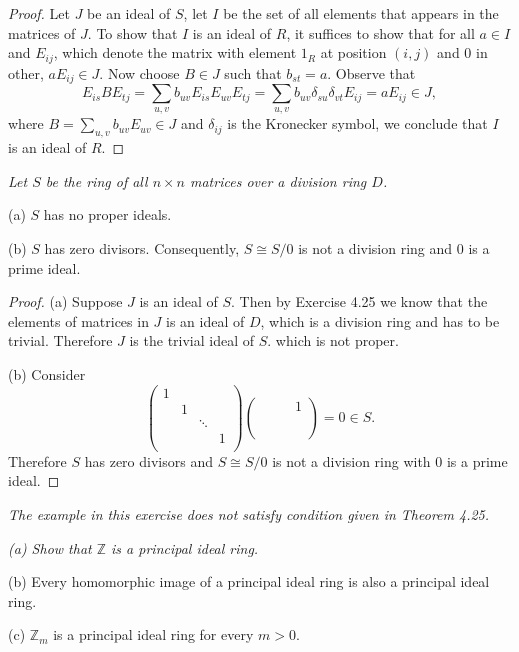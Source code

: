\begin{proof}
Let $J$ be an ideal of $S$, let $I$ be the set of all elements that appears in the matrices of $J$. To show that $I$ is an ideal of $R$, it suffices to show that for all $a\in I$ and $E_{ij}$, which denote the matrix with element $1_R$ at position $(i,j)$ and $0$ in other, $aE_{ij}\in J$. Now choose $B\in J$ such that $b_{st}=a$. Observe that 
$$
E_{is}BE_{tj}=\sum_{u,v}{b_{uv}E_{is}E_{uv}E_{tj}}=\sum_{u,v}{b_{uv}\delta _{su}\delta _{vt}E_{ij}}=aE_{ij}\in J,
$$
where $B=\sum_{u,v}b_{uv}E_{uv}\in J$ and $\delta_{ij}$ is the Kronecker symbol, we conclude that $I$ is an ideal of $R$.
\end{proof}
\begin{problem}\em
Let $S$ be the ring of all $n\times n$ matrices over a division ring $D$.\par
(a) $S$ has no proper ideals.\par
(b) $S$ has zero divisors. Consequently, $S\cong S/0$ is not a division ring and $0$ is a prime ideal.
\end{problem}
\begin{proof}
(a) Suppose $J$ is an ideal of $S$. Then by Exercise 4.25 we know that the elements of matrices in $J$ is an ideal of $D$, which is a division ring and has to be trivial. Therefore $J$ is the trivial ideal of $S$. which is not proper.\par
(b) Consider 
$$
\left( \begin{matrix}
	1&		&		&		\\
	&		1&		&		\\
	&		&		\ddots&		\\
	&		&		&		1\\
\end{matrix} \right) \left( \begin{matrix}
	&		&		&		1\\
	&		&		&		\\
	&		&		&		\\
	&		&		&		\\
\end{matrix} \right) =0\in S.
$$
Therefore $S$ has zero divisors and $S\cong S/0$ is not a division ring with $0$ is a prime ideal.
\end{proof}
\begin{note}\em
The example in this exercise does not satisfy condition given in Theorem 4.25.
\end{note}
\begin{problem}\em
(a) Show that $\mathbb{Z}$ is a principal ideal ring.\par
(b) Every homomorphic image of a principal ideal ring is also a principal ideal ring.\par
(c) $\mathbb{Z}_m$ is a principal ideal ring for every $m>0$.
\end{problem}

